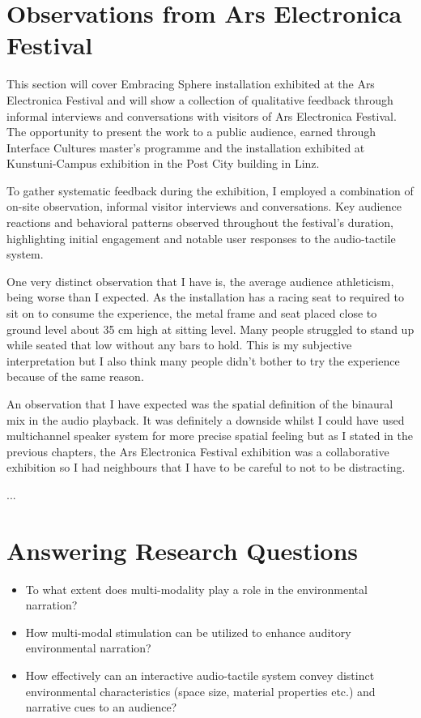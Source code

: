     \section{Observations from Ars Electronica Festival}
        This section will cover Embracing Sphere installation exhibited at the Ars Electronica Festival and will show a collection of qualitative feedback through informal interviews and conversations with visitors of Ars Electronica Festival. The opportunity to present the work to a public audience, earned through Interface Cultures master's programme and the installation exhibited at Kunstuni-Campus exhibition in the Post City building in Linz.\par

        To gather systematic feedback during the exhibition, I employed a combination of on-site observation, informal visitor interviews and conversations. Key audience reactions and behavioral patterns observed throughout the festival’s duration, highlighting initial engagement and notable user responses to the audio-tactile system.\par

        One very distinct observation that I have is, the average audience athleticism, being worse than I expected. As the installation has a racing seat to required to sit on to consume the experience, the metal frame and seat placed close to ground level about 35 cm high at sitting level. Many people struggled to stand up while seated that low without any bars to hold. This is my subjective interpretation but I also think many people didn't bother to try the experience because of the same reason.\par

        An observation that I have expected was the spatial definition of the binaural mix in the audio playback. It was definitely a downside whilst I could have used multichannel speaker system for more precise spatial feeling but as I stated in the previous chapters, the Ars Electronica Festival exhibition was a collaborative exhibition so I had neighbours that I have to be careful to not to be distracting.\par

        ...\par
    \section{Answering Research Questions}
        \begin{itemize}
            \item To what extent does multi-modality play a role in the environmental narration?
            \item How multi-modal stimulation can be utilized to enhance auditory environmental narration?
            \item How effectively can an interactive audio-tactile system convey distinct environmental characteristics (space size, material properties etc.) and narrative cues to an audience?
        \end{itemize}

